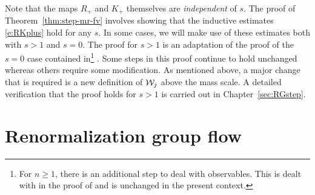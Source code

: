 
Note that the maps $R_+$ and $K_+$ themselves are \emph{independent} of $s$.
The proof of Theorem~\ref{thm:step-mr-fv} involves showing that the
inductive estimates \eqref{e:RKplus} hold for any $s$. In some cases,
we will make use of these estimates both with $s > 1$ and $s = 0$.
The proof for $s > 1$ is an adaptation of the proof of the $s = 0$ case contained
in\footnote{For $n \ge 1$, there is an additional step to deal with observables.
This is dealt with in the proof of \cite[Theorem~\ref{phi4-thm:step-mr-fv}]{ST-phi4}
and is unchanged in the present context.}
\cite{BS-rg-IE,BS-rg-step}.
Some steps in this proof continue to hold unchanged whereas others require
some modification. As mentioned above, a major change that is required is
a new definition of $\mathcal{W}_j$ above the mass scale. A detailed verification
that the proof holds for $s > 1$ is carried out in Chapter~\ref{sec:RGstep}.


\section{Renormalization group flow}


